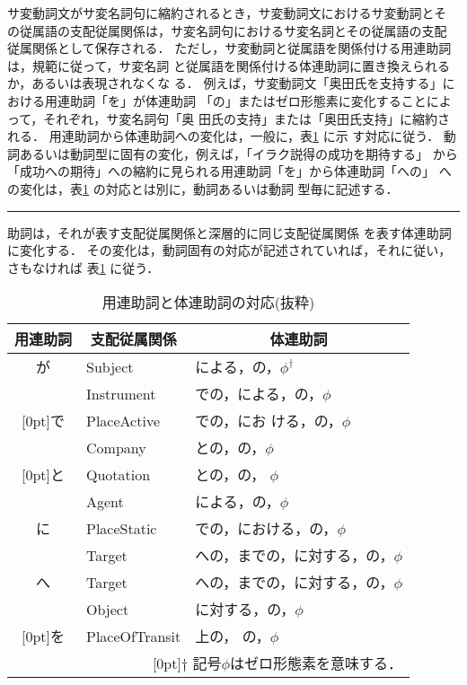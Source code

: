 サ変動詞文がサ変名詞句に縮約されるとき，サ変動詞文におけるサ変動詞とそ
の従属語の支配従属関係は，サ変名詞句におけるサ変名詞とその従属語の支配
従属関係として保存される．
ただし，サ変動詞と従属語を関係付ける用連助詞は，規範に従って，サ変名詞
と従属語を関係付ける体連助詞に置き換えられるか，あるいは表現されなくな
る．
例えば，サ変動詞文「奥田氏を支持する」における用連助詞「を」が体連助詞
「の」またはゼロ形態素に変化することによって，それぞれ，サ変名詞句「奥
田氏の支持」または「奥田氏支持」に縮約される．
用連助詞から体連助詞への変化は，一般に，表\ref{tab:youren2tairen} に示
す対応に従う．
動詞あるいは動詞型に固有の変化，例えば，「イラク説得の成功を期待する」
から「成功への期待」への縮約に見られる用連助詞「を」から体連助詞「への」
への変化は，表\ref{tab:youren2tairen} の対応とは別に，動詞あるいは動詞
型毎に記述する．
\begin{RULE}
\rule 用連助詞は，それが表す支配従属関係と深層的に同じ支配従属関係
\footnotemark
を表す体連助詞に変化する．
その変化は，動詞固有の対応が記述されていれば，それに従い，さもなければ
表\ref{tab:youren2tairen} に従う．\label{RULE:youren2tairen}
\end{RULE}
\begin{table}[htbp]
\caption{用連助詞と体連助詞の対応(抜粋)}
\label{tab:youren2tairen}
\begin{center}
\begin{tabular}{|c|l|l|} \hline
用連助詞&\multicolumn{1}{|c}{支配従属関係}&
\multicolumn{1}{|c|}{体連助詞}\\\hline\hline 
が&Subject&による，の，$\phi^\dagger$\\\hline
&Instrument&での，による，の，$\phi$\\
\multicolumn{1}{|c|}{\raisebox{1.5ex}[0pt]{で}}&PlaceActive&での，にお
ける，の，$\phi$\\\hline
&Company&との，の，$\phi$\\
\multicolumn{1}{|c|}{\raisebox{1.5ex}[0pt]{と}}&Quotation&との，の，
$\phi$\\\hline
&Agent&による，の，$\phi$\\
に &PlaceStatic&での，における，の，$\phi$\\
&Target&への，までの，に対する，の，$\phi$\\\hline
へ&Target&への，までの，に対する，の，$\phi$\\\hline
&Object&に対する，の，$\phi$\\
\multicolumn{1}{|c|}{\raisebox{1.5ex}[0pt]{を}}&PlaceOfTransit&上の，
の，$\phi$\\\hline
\multicolumn{3}{r}{\raisebox{0.5ex}[0pt]{\scriptsize $\dagger$}
{\footnotesize 記号$\phi$はゼロ形態素を意味する．}}\\
\end{tabular}
\end{center}
\end{table}

